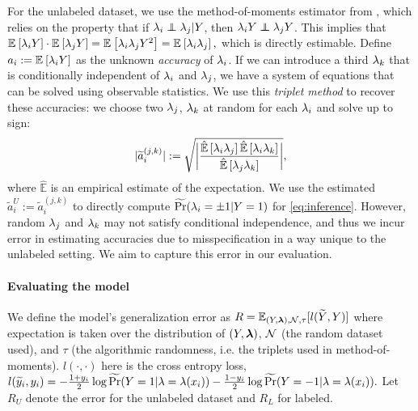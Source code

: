 For the unlabeled dataset, we use the method-of-moments estimator from \cite{fu2020fast}, which relies on the property
that if $\lf_i \independent \lf_j | Y$, then $\lf_i Y \independent \lf_j Y$.
%
This implies that $\mathbb{E}_{}\left[\lambda_i Y\right] \cdot \mathbb{E}_{}\left[\lambda_j Y\right] = \mathbb{E}_{}\left[\lambda_i \lambda_j Y^2\right] = \mathbb{E}_{}\left[\lambda_i \lambda_j\right],$ which is directly estimable.
Define $a_i := \mathbb{E}_{}\left[\lambda_i Y\right]$ as the unknown \textit{accuracy} of $\lambda_i$. If we can introduce a third $\lambda_k$ that is conditionally independent of $\lambda_i$ and $\lambda_j$, we have a system of equations that can be solved using observable statistics. We use this \textit{triplet method} to recover these accuracies: we choose two $\lambda_j$, $\lambda_k$ at random for each $\lambda_i$ and solve up to sign:
\begin{align}
    |\widetilde{a}_i^{(j, k)}| := \sqrt{\bigg| \frac{\hat{\mathbb{E}}\left[\lambda_i \lambda_j\right] \hat{\mathbb{E}}\left[\lambda_i \lambda_k\right]}{\hat{\mathbb{E}}\left[\lambda_j \lambda_k\right]} \bigg|},
    \label{eq:triplet}
\end{align}
where $\hat{\mathbb{E}}$ is an empirical estimate of the expectation. %
We use the estimated $\widetilde{a}_i^U := \widetilde{a}_i^{(j, k)}$ to directly compute $\widetilde{\Pr}(\lambda_i = \pm 1 | Y = 1)$ for \eqref{eq:inference}. However, random $\lambda_j$ and $\lambda_k$ may not satisfy conditional independence, and thus we incur error in estimating accuracies due to misspecification in a way unique to the unlabeled setting. We aim to capture this error in our evaluation. %

\paragraph{Evaluating the model}
We define the model's generalization error as $R = \mathbb{E}_{(Y, \bm{\lambda}), \mathcal{N}, \tau}[l(\widetilde{Y}, Y)]$ where expectation is taken over the distribution of $(Y, \bm{\lambda})$, $\mathcal{N}$ (the random dataset used), and $\tau$ (the algorithmic randomness, i.e. the triplets used in method-of-moments). $l(\cdot, \cdot)$ here is the cross entropy loss,
$l(\widetilde{y}_i, y_i) = -\frac{1 + y_i}{2} \log \widetilde{\Pr}(Y = 1 | \lambda = \lambda(x_i))
- \frac{1 - y_i}{2} \log \widetilde{\Pr}(Y = -1 | \lambda = \lambda(x_i)).$
Let $R_U$ denote the error for the unlabeled dataset and $R_L$ for labeled.

